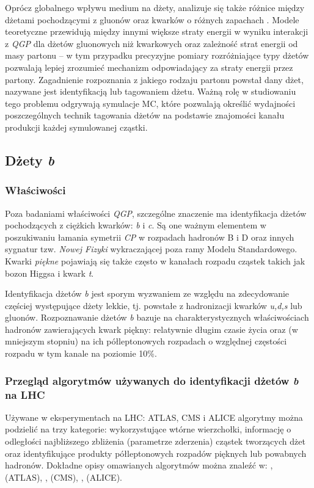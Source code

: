 Oprócz globalnego wpływu medium na dżety, analizuje się także różnice między dżetami pochodzącymi z gluonów oraz kwarków o różnych zapachach . Modele teoretyczne przewidują między innymi większe straty energii w wyniku interakcji z \textit{QGP} dla dżetów gluonowych niż kwarkowych \cite{Salgado:2003gb} oraz zależność strat energii od masy partonu \cite{Dokshitzer:2001zm} -- w tym przypadku precyzyjne pomiary rozróżniające typy dżetów pozwalają lepiej zrozumieć mechanizm odpowiadający za straty energii przez partony. Zagadnienie rozpoznania z jakiego rodzaju partonu powstał dany dżet, nazywane jest identyfikacją lub tagowaniem dżetu.
Ważną rolę w studiowaniu tego problemu odgrywają symulacje MC, które pozwalają określić wydajności poszczególnych technik tagowania dżetów na podstawie znajomości kanału produkcji każdej symulowanej cząstki.

\subsection{Dżety \textit{b}}
\label{subsec:b-dzety}

\subsubsection{Właściwości}
Poza badaniami właściwości \textit{QGP}, szczególne znaczenie ma identyfikacja dżetów pochodzących z ciężkich kwarków: \textit{b} i \textit{c}.
Są one ważnym elementem w poszukiwaniu łamania symetrii \textit{CP} w rozpadach hadronów B i D oraz innych sygnatur tzw. \textit{Nowej Fizyki} wykraczającej poza ramy Modelu Standardowego. 
Kwarki \textit{piękne} pojawiają się także często w kanałach rozpadu cząstek takich jak bozon Higgsa i kwark \textit{t}.

Identyfikacja dżetów \textit{b} jest sporym wyzwaniem ze względu na zdecydowanie częściej występujące dżety lekkie, tj. powstałe z hadronizacji kwarków \textit{u,d,s} lub gluonów.
Rozpoznawanie dżetów \textit{b} bazuje na charakterystycznych właściwościach hadronów zawierających kwark piękny: relatywnie długim czasie życia oraz (w mniejszym stopniu) na ich półleptonowych rozpadach o względnej częstości rozpadu w tym kanale  na poziomie 10\%.

\subsubsection{Przegląd algorytmów używanych do identyfikacji dżetów \textit{b} na LHC} 
\label{subsubsec:przeglad-algo}
Używane w eksperymentach na LHC: ATLAS, CMS i ALICE algorytmy można podzielić na trzy kategorie: wykorzystujące wtórne wierzchołki,  informację o odległości najbliższego zbliżenia (parametrze zderzenia) cząstek tworzących dżet  oraz identyfikujące produkty półleptonowych rozpadów pięknych lub powabnych hadronów. Dokładne opisy omawianych algorytmów można znaleźć w: \cite{Aad:2015ydr}, \cite{Aaboud:2018xwy} (ATLAS), \cite{Chatrchyan:2012jua}, \cite{Sirunyan:2017ezt} (CMS), \cite{Feldkamp:2013cya}, \cite{Haake:2017dpr} (ALICE).

